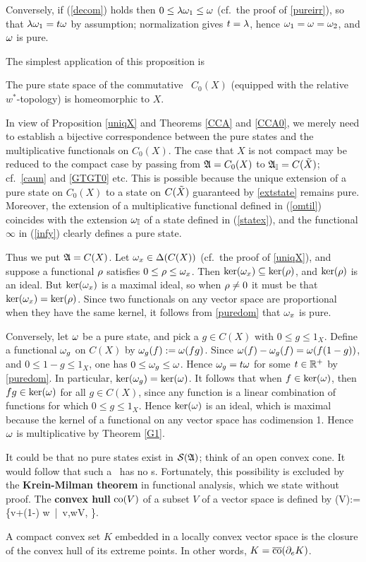 Conversely, if (\ref{decom}) holds then $0\leq\lambda\omega_1\leq\omega$ (cf.\
the proof of \ref{pureirr}), so that $\lambda\omega_1=t\omega$ by assumption;
normalization gives $t=\lambda$, hence $\omega_1=\omega=\omega_2$, and $\omega$ is
pure.\enp

The simplest application of this proposition is
\begin{Theorem}
The pure state space of the commutative \ca\ $C_0(X)$ (equipped with
the relative $w^*$-topology) is homeomorphic to $X$.
\end{Theorem}

In view of Proposition \ref{uniqX} and Theorems \ref{CCA} and
\ref{CCA0}, we merely need to establish a bijective correspondence
between the pure states and the multiplicative functionals on
$C_0(X)$.  The case that $X$ is not compact may be reduced to the
compact case by passing from ${\frak A}=C_0(X)$ to ${\frak A}_{\Bbb I}=C(\tilde{X})$; cf.\
\ref{caun} and \ref{GTGT0} etc. This is possible because the unique
extension of a pure state on $C_0(X)$ to a state on $C(\tilde{X})$
guaranteed by \ref{extstate} remains pure. Moreover, the extension of
a multiplicative functional defined in (\ref{omtil}) coincides with
the extension $\omega_{{\Bbb I}}$ of a state defined in (\ref{statex}), and the
functional $\infty$ in (\ref{infy}) clearly defines a pure state.
 
Thus we put ${\frak A}=C(X)$. Let $\omega_x\in\Delta(C(X))$ (cf.\ the proof of
\ref{uniqX}), and suppose a functional $\rho$ satisfies
$0\leq\rho\leq\omega_x$. Then $\ker(\omega_x)\subseteq\ker(\rho)$, and
$\ker(\rho)$ is an ideal. But $\ker(\omega_x)$ is a maximal ideal, so when
$\rho\neq 0$ it must be that $\ker(\omega_x)=\ker(\rho)$. Since two
functionals on any vector space are proportional when they have the
same kernel, it follows from \ref{puredom} that $\omega_x$ is pure.

Conversely, let $\omega$ be a pure state, and pick a $g\in C(X)$ with
$0\leq g\leq 1_X$.  Define a functional $\omega_g$ on $C(X)$ by
$\omega_g(f):=\omega(fg)$. Since $\omega(f)-\omega_g(f)= \omega(f(1-g))$, and $0\leq
1-g\leq 1_X$, one has $0\leq\omega_g\leq\omega$.  Hence $\omega_g =t\omega$ for
some $t\in{\Bbb R}^+$ by \ref{puredom}. In particular,
$\ker(\omega_g)=\ker(\omega)$.  It follows that when $f\in\ker(\omega)$, then
$fg\in\ker(\omega)$ for all $g\in C(X)$, since any function is a linear
combination of functions for which $0\leq g\leq 1_X$. Hence
$\ker(\omega)$ is an ideal, which is maximal because the kernel of a
functional on any vector space has codimension 1.  Hence $\omega$ is
multiplicative by Theorem \ref{G1}.\enp

It could be that no pure states exist in ${\cal S}({\frak A})$; think of an open
convex cone. It would follow that such a \ca\ has no \irrep s.
Fortunately, this possibility is excluded by the {\bf Krein-Milman
theorem} in functional analysis, which we state without proof.  The
{\bf convex hull} ${\rm co}(V)$ of a subset $V$ of a vector space is
defined by \be {\rm co}(V):=\{\lm v+(1-\lm) w\, |\, v,w\in V, \lm\in
[0,1]\}. \ll{cohull} \ee \begin{Theorem}\ll{kreinmilman} A compact
convex set $K$ embedded in a locally convex vector space is the
closure of the convex hull of its extreme points. In other words,
$K=\overline{\mbox{\rm co}}(\partial_e K)$.
\end{Theorem}

